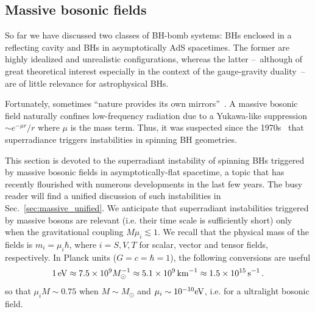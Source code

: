 \documentclass[11pt]{article}
\numberwithin{equation}{section} %
\begin{document}
\subsection{Massive bosonic fields}\label{sec:mass}
So far we have discussed two classes of BH-bomb systems: BHs enclosed in a reflecting cavity and BHs in asymptotically AdS spacetimes. The former are highly idealized and unrealistic configurations, whereas the latter --~although of great theoretical interest especially in the context of the gauge-gravity duality~-- are of little relevance for astrophysical BHs. 

Fortunately, sometimes ``nature provides its own mirrors''~\cite{Press:1972zz,Cardoso:2004nk}. A massive bosonic field naturally confines low-frequency radiation due to a Yukawa-like suppression $\sim e^{-\mu r}/r$ where $\mu$ is the mass term. Thus, it was suspected since the 1970s~\cite{Press:1972zz,Damour:1976kh} that superradiance triggers instabilities in spinning BH geometries.

This section is devoted to the superradiant instability of spinning BHs triggered by massive bosonic fields in asymptotically-flat spacetime, a topic that has recently flourished with numerous developments in the last few years. The busy reader will find a unified discussion of such instabilities in Sec.~\ref{sec:massive_unified}. We anticipate that superradiant instabilities triggered by massive bosons are relevant (i.e. their time scale is sufficiently short) only when the gravitational coupling $M\mu_i\lesssim1$. We recall that the physical mass of the fields is $m_{i}=\mu_{i}\hbar$, where $i=S,V,T$ for scalar, vector and tensor fields, respectively. In Planck units ($G=c=\hbar=1$), the following conversions are useful
\begin{equation}
 1\,{\rm eV} \approx 7.5\times 10^9 M_\odot^{-1}\approx 5.1 \times 10^{9}\, {\rm km}^{-1}\approx 1.5\times10^{15}\,{\rm s}^{-1}\,. \label{conversion}
\end{equation}
so that $\mu_i M\sim 0.75$ when $M\sim M_\odot$ and $\mu_i\sim 10^{-10}{\rm eV}$, i.e. for a ultralight bosonic field.

\end{document}
